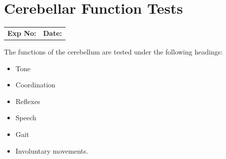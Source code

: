 \documentclass[a4paper,12pt]{book}
\begin{document}
															\chapter*{\centering Cerebellar Function Tests}
															\begin{tabular}{p{5in} p{1in}}
																\textbf{Exp No:}  & \textbf{Date:}\\
															\end{tabular}
The functions of the cerebellum are tested under the following headings:
\begin{itemize}
\item{Tone}
\item{Coordination}
\item{Reflexes}
\item{Speech}
\item{Gait}
\item{Involuntary movements.}
\end{itemize}
\end{document}
